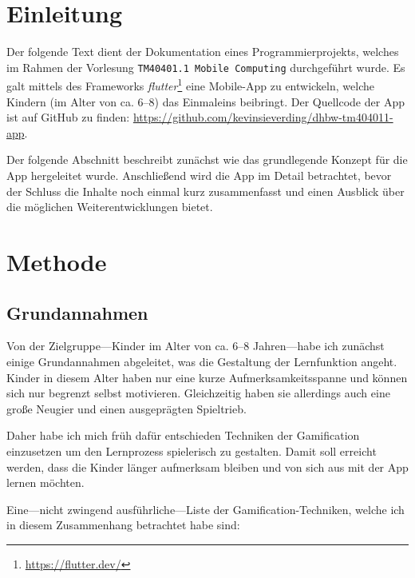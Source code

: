 
\section{Einleitung}\label{sec:introduction}

Der folgende Text dient der Dokumentation eines Programmierprojekts, welches im Rahmen der Vorlesung \texttt{TM40401.1 Mobile Computing} durchgeführt wurde.
Es galt mittels des Frameworks \emph{flutter}\footnote{\url{https://flutter.dev/}} eine Mobile-App zu entwickeln, welche Kindern (im Alter von ca. 6--8) das Einmaleins beibringt.
Der Quellcode der App ist auf GitHub zu finden: \url{https://github.com/kevinsieverding/dhbw-tm404011-app}.

Der folgende Abschnitt beschreibt zunächst wie das grundlegende Konzept für die App hergeleitet wurde.
Anschließend wird die App im Detail betrachtet, bevor der Schluss die Inhalte noch einmal kurz zusammenfasst und einen Ausblick über die möglichen Weiterentwicklungen bietet.

\section{Methode}

\subsection{Grundannahmen}

Von der Zielgruppe---Kinder im Alter von ca. 6--8 Jahren---habe ich zunächst einige Grundannahmen abgeleitet, was die Gestaltung der Lernfunktion angeht.
Kinder in diesem Alter haben nur eine kurze Aufmerksamkeitsspanne und können sich nur begrenzt selbst motivieren. Gleichzeitig haben sie allerdings auch eine große Neugier und einen ausgeprägten Spieltrieb.

Daher habe ich mich früh dafür entschieden Techniken der Gamification einzusetzen um den Lernprozess spielerisch zu gestalten.
Damit soll erreicht werden, dass die Kinder länger aufmerksam bleiben und von sich aus mit der App lernen möchten.

Eine---nicht zwingend ausführliche---Liste der Gamification-Techniken, welche ich in diesem Zusammenhang betrachtet habe sind:

